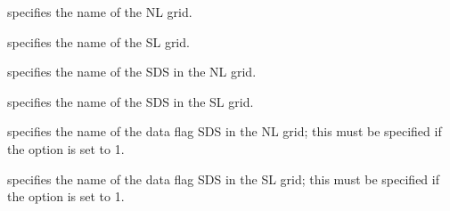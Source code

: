   specifies the name of the NL grid.

  specifies the name of the SL grid.

  specifies the name of the SDS in the
 NL grid.

  specifies the name of the SDS in the
 SL grid.

  specifies the name of
 the data
 flag SDS in the NL grid; this must be specified if
 the  option is set to 1.

  specifies the name of
 the data
 flag SDS in the SL grid; this must be specified if
 the  option is set to 1.
 

